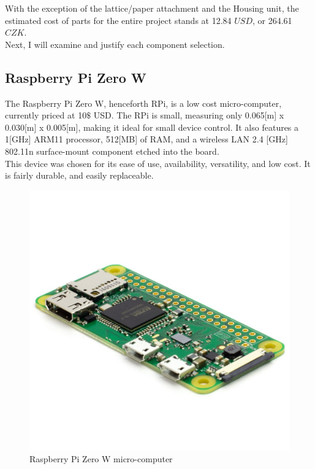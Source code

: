 \documentclass[twoside]{ctuthesis}
\theoremstyle{plain}
\theoremstyle{definition}
\theoremstyle{note}
\begin{document}
With the exception of the lattice/paper attachment and the Housing unit, the estimated cost of parts for the entire project stands at 12.84 $USD$, or 264.61 $CZK$.\\
Next, I will examine and justify each component selection.

\subsection{Raspberry Pi Zero W}
The Raspberry Pi Zero W, henceforth RPi, is a low cost micro-computer, currently priced at 10$\$$ USD. The RPi is small, measuring only 0.065[m] x 0.030[m] x 0.005[m], making it ideal for small device control. It also features a 1[GHz] ARM11 processor, 512[MB] of RAM, and a wireless LAN 2.4 [GHz] 802.11n surface-mount component etched into the board.\\
This device was chosen for its ease of use, availability, versatility, and low cost. It is fairly durable, and easily replaceable.

\begin{figure}[H]
	\centering
	\includegraphics[scale=0.15]{RasPIZeroW}
	\caption{Raspberry Pi Zero W micro-computer \cite{RasPi0W}}
\end{figure}
\end{document}
